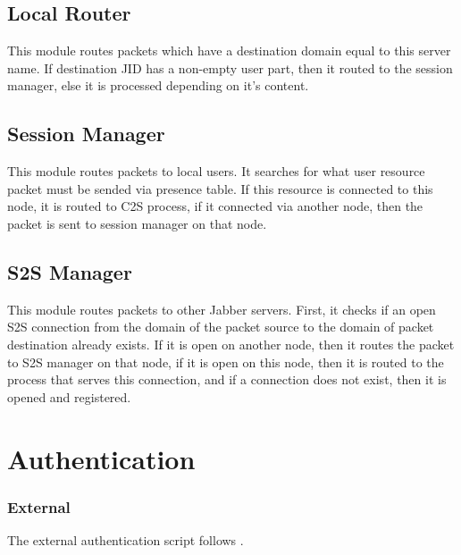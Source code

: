 \documentclass[a4paper,10pt]{article}
\newcommand{\ind}[1]{\begin{latexonly}\index{#1}\end{latexonly}}
\newcommand{\Jabber}{Jabber}
\begin{document}
\subsection{Local Router}

This module routes packets which have a destination domain equal to this server
name.  If destination JID has a non-empty user part, then it routed to the
session manager, else it is processed depending on it's content.


\subsection{Session Manager}

This module routes packets to local users.  It searches for what user resource
packet must be sended via presence table.  If this resource is connected to
this node, it is routed to C2S process, if it connected via another node, then
the packet is sent to session manager on that node.


\subsection{S2S Manager}

This module routes packets to other \Jabber{} servers.  First, it checks if an
open S2S connection from the domain of the packet source to the domain of
packet destination already exists. If it is open on another node, then it
routes the packet to S2S manager on that node, if it is open on this node, then
it is routed to the process that serves this connection, and if a connection
does not exist, then it is opened and registered.


\section{Authentication}

\subsubsection{External}
\label{externalauth}
\ind{external authentication}

The external authentication script follows
.
\end{document}
